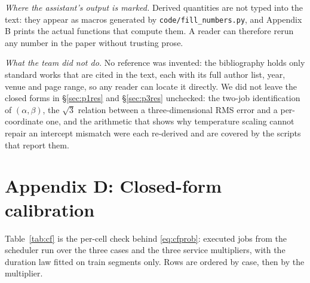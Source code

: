 \documentclass{swmcmthesis}
\begin{document}
\emph{Where the assistant's output is marked.} Derived quantities are not typed
into the text: they appear as macros generated by \texttt{code/fill\_numbers.py},
and Appendix B prints the actual functions that compute them. A reader can
therefore rerun any number in the paper without trusting prose.

\emph{What the team did not do.} No reference was invented: the bibliography holds
only standard works that are cited in the text, each with its full author list,
year, venue and page range, so any reader can locate it directly. We did not
leave the closed forms in \S\ref{sec:p1res} and \S\ref{sec:p3res} unchecked: the
two-job identification of $(\alpha,\beta)$, the $\sqrt{3}$ relation between a
three-dimensional RMS error and a per-coordinate one, and the arithmetic that
shows why temperature scaling cannot repair an intercept mismatch were each
re-derived and are covered by the scripts that report them.

\section*{Appendix D: Closed-form calibration}
Table~\ref{tab:cf} is the per-cell check behind \eqref{eq:cfprob}: \slotPCFJobs{} executed
jobs from the scheduler run over the three cases and the three service multipliers, with
the duration law fitted on train segments only. Rows are ordered by case, then by the
multiplier.
\end{document}
